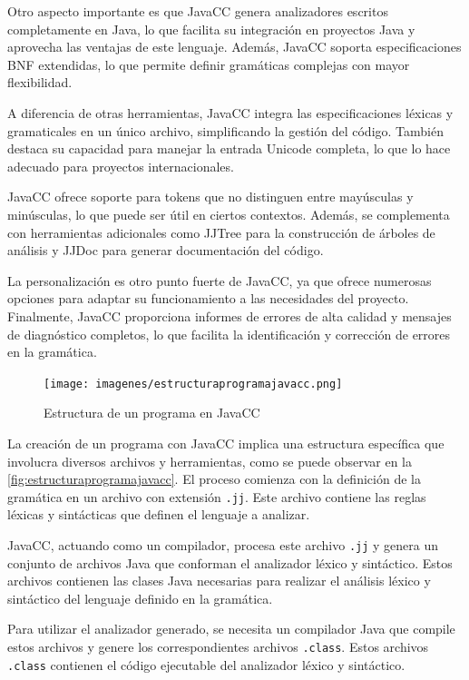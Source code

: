 Otro aspecto importante es que JavaCC genera analizadores escritos completamente en Java, lo que facilita su integración en proyectos Java y aprovecha las ventajas de este lenguaje. Además, JavaCC soporta especificaciones BNF extendidas, lo que permite definir gramáticas complejas con mayor flexibilidad.

A diferencia de otras herramientas, JavaCC integra las especificaciones léxicas y gramaticales en un único archivo, simplificando la gestión del código. También destaca su capacidad para manejar la entrada Unicode completa, lo que lo hace adecuado para proyectos internacionales.

JavaCC ofrece soporte para tokens que no distinguen entre mayúsculas y minúsculas, lo que puede ser útil en ciertos contextos. Además, se complementa con herramientas adicionales como JJTree para la construcción de árboles de análisis y JJDoc para generar documentación del código.

La personalización es otro punto fuerte de JavaCC, ya que ofrece numerosas opciones para adaptar su funcionamiento a las necesidades del proyecto. Finalmente, JavaCC proporciona informes de errores de alta calidad y mensajes de diagnóstico completos, lo que facilita la identificación y corrección de errores en la gramática.

\begin{figure}[H]
	\centering
	\texttt{[image: imagenes/estructuraprogramajavacc.png]}
	\caption{\label{fig:estructuraprogramajavacc}Estructura de un programa en JavaCC \cite{estructuraprogramajavacc}}
\end{figure}

La creación de un programa con JavaCC implica una estructura específica que involucra diversos archivos y herramientas, como se puede observar en la \autoref{fig:estructuraprogramajavacc}. El proceso comienza con la definición de la gramática en un archivo con extensión \lstinline|.jj|. Este archivo contiene las reglas léxicas y sintácticas que definen el lenguaje a analizar.

JavaCC, actuando como un compilador, procesa este archivo \lstinline|.jj| y genera un conjunto de archivos Java que conforman el analizador léxico y sintáctico. %
Estos archivos contienen las clases Java necesarias para realizar el análisis léxico y sintáctico del lenguaje definido en la gramática.

Para utilizar el analizador generado, se necesita un compilador Java que compile estos archivos y genere los correspondientes archivos \lstinline|.class|. Estos archivos \lstinline|.class| contienen el código ejecutable del analizador léxico y sintáctico.


